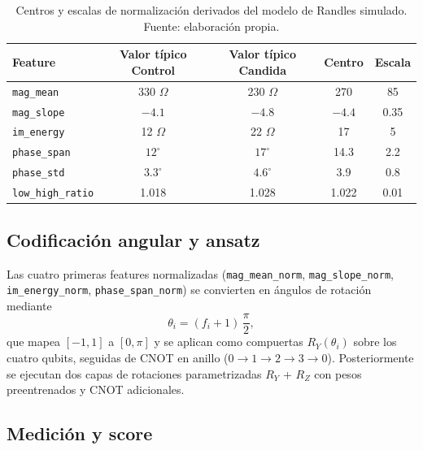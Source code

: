 \documentclass[11pt,a4paper,spanish]{book}
\begin{document}
\begin{table}[ht]
	\centering
	\scriptsize
	\begin{tabular}{l c c c c}
		\hline\hline
		Feature                 & Valor t\'{i}pico Control & Valor t\'{i}pico Candida & Centro & Escala \\ [0.5ex]
		\hline
		\texttt{mag\_mean}      & 330 $\Omega$           & 230 $\Omega$             & 270    & 85     \\
		\texttt{mag\_slope}     & $-4.1$                  & $-4.8$                   & $-4.4$ & 0.35   \\
		\texttt{im\_energy}     & 12 $\Omega$             & 22 $\Omega$              & 17     & 5      \\
		\texttt{phase\_span}    & $12^\circ$              & $17^\circ$               & 14.3   & 2.2    \\
		\texttt{phase\_std}     & $3.3^\circ$             & $4.6^\circ$              & 3.9    & 0.8    \\
		\texttt{low\_high\_ratio} & 1.018                 & 1.028                    & 1.022  & 0.01   \\
		\hline
	\end{tabular}
	\caption[Normalizaci\'{o}n de features]{Centros y escalas de normalizaci\'{o}n derivados del modelo de Randles simulado. Fuente: elaboraci\'{o}n propia.}
	\label{tab:features-norm}
\end{table}

\subsection{Codificaci\'{o}n angular y ansatz}

Las cuatro primeras features normalizadas (\texttt{mag\_mean\_norm}, \texttt{mag\_slope\_norm}, \texttt{im\_energy\_norm}, \texttt{phase\_span\_norm}) se convierten en \'{a}ngulos de rotaci\'{o}n mediante
\[
\theta_i = (f_i + 1)\,\frac{\pi}{2},
\]
que mapea $[-1, 1]$ a $[0, \pi]$ y se aplican como compuertas $R_Y(\theta_i)$ sobre los cuatro qubits, seguidas de CNOT en anillo ($0\!\rightarrow\!1\!\rightarrow\!2\!\rightarrow\!3\!\rightarrow\!0$). Posteriormente se ejecutan dos capas de rotaciones parametrizadas $R_Y$ + $R_Z$ con pesos preentrenados y CNOT adicionales.

\subsection{Medici\'{o}n y score}
\end{document}
